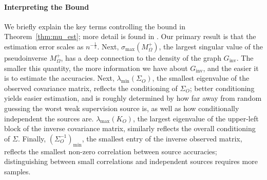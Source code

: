 \documentclass[letterpaper]{article}
\begin{document}
 
\paragraph{Interpreting the Bound} 
We briefly explain the key terms controlling the bound in Theorem~\ref{thm:mu_est}; more detail is found in .
Our primary result is that the estimation error scales as $n^{-\frac12}$.
Next, $\sigma_{\max}(M_{\Omega}^+)$, the largest singular value of the pseudoinverse $M_{\Omega}^+$, has a deep connection to the density of the graph $G_{\text{inv}}$.
The smaller this quantity, the more information we have about $G_{\text{inv}}$, and the easier it is to estimate the accuracies. 
Next, $\lambda_{\min}(\Sigma_O)$, the smallest eigenvalue of the observed covariance matrix, reflects the conditioning of $\Sigma_O$; better conditioning yields easier estimation, and is roughly determined by how far away from random guessing the worst weak supervision source is, as well as how conditionally independent the sources are.
$\lambda_{\textrm{max}}(K_O)$, the largest eigenvalue of the upper-left block of the inverse covariance matrix, similarly reflects the overall conditioning of $\Sigma$.
Finally, $(\Sigma_O^{-1})_{\min}$, the smallest entry of the inverse observed matrix, reflects the smallest non-zero correlation between source accuracies; distinguishing between small correlations and independent sources requires more samples.
\end{document}
